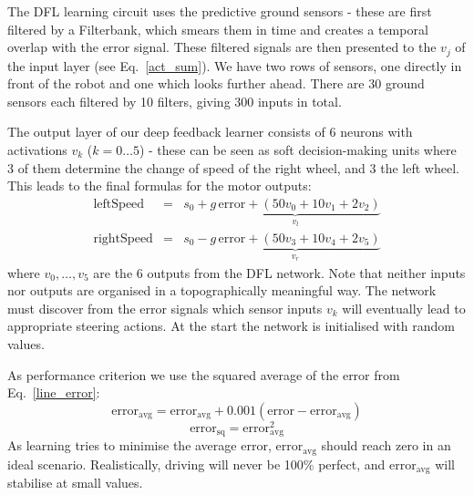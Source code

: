 \documentclass{aamas2018}
\begin{document}
The DFL learning circuit uses the predictive ground sensors - these
are first filtered by a Filterbank, which smears them in time and
creates a temporal overlap with the error signal. These filtered
signals are then presented to the $v_j$ of the input layer (see
Eq.~\ref{act_sum}). We have two rows of sensors, one directly in front
of the robot and one which looks further ahead. There are 30 ground
sensors each filtered by 10 filters, giving 300 inputs in total.

The output layer of our deep feedback learner consists of 6 neurons
with activations $v_k$ ($k=0 \ldots 5$) - these can be seen as soft
decision-making units where 3 of them determine the change of speed of
the right wheel, and 3 the left wheel. This leads to the
final formulas for the motor outputs:
\begin{eqnarray}
  \mathrm{leftSpeed} &=& s_0 + \underbrace{g\, \mathrm{error} + \left( 50 v_0 + 10 v_1 + 2 v_2 \right)}_{v_l} \\
  \mathrm{rightSpeed} &=& s_0 - \underbrace{g\, \mathrm{error} + \left( 50 v_3 + 10 v_4 + 2 v_5 \right)}_{v_r}
\end{eqnarray}
where $v_0, \ldots, v_5$ are the 6 outputs from the DFL network. Note
that neither inputs nor outputs are organised in a topographically
meaningful way. The network must discover from the error signals
which sensor inputs $v_k$ will eventually lead to appropriate steering
actions. At the start the network is initialised with random values.

As performance criterion we use the squared average of the error from
Eq.~\ref{line_error}:
\begin{equation}
  \mathrm{error}_\mathrm{avg} =  \mathrm{error}_\mathrm{avg} + 0.001 (\mathrm{error} - \mathrm{error}_\mathrm{avg}) 
\end{equation}
\begin{equation}
  \mathrm{error}_\mathrm{sq} =  \mathrm{error}_\mathrm{avg}^2 \label{line_sqerr}
\end{equation}
As learning tries to minimise the average error, $\mathrm{error}_\mathrm{avg}$ should reach zero in an ideal
scenario. Realistically, driving will never be 100\% perfect, and $\mathrm{error}_\mathrm{avg}$
will stabilise at small values.
\end{document}
